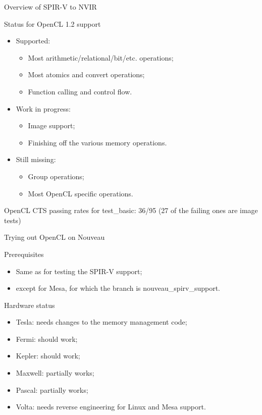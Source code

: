 \documentclass[11pt,english,compress]{beamer}
\begin{document}
\begin{frame}{Overview of SPIR-V to NVIR}
	\begin{block}{Status for OpenCL 1.2 support}
		\begin{itemize}
			\item Supported:
			\begin{itemize}
				\item Most arithmetic/relational/bit/etc. operations;
				\item Most atomics and convert operations;
				\item Function calling and control flow.
			\end{itemize}
			\item Work in progress:
			\begin{itemize}
				\item Image support;
				\item Finishing off the various memory operations.
			\end{itemize}
			\item Still missing:
			\begin{itemize}
				\item Group operations;
				\item Most OpenCL specific operations.
			\end{itemize}
		\end{itemize}

		OpenCL CTS passing rates for test\_basic: 36/95 (27 of the
		failing ones are image tests)
	\end{block}
\end{frame}

\begin{frame}{Trying out OpenCL on Nouveau}
	\begin{block}{Prerequisites}
		\begin{itemize}
			\item Same as for testing the SPIR-V support;
			\item except for Mesa, for which the branch is
				nouveau\_spirv\_support.
		\end{itemize}
	\end{block}
	\begin{block}{Hardware status}
		\begin{itemize}
			\item Tesla: needs changes to the memory management
				code;
			\item Fermi: should work;
			\item Kepler: should work;
			\item Maxwell: partially works;
			\item Pascal: partially works;
			\item Volta: needs reverse engineering for Linux and
				Mesa support.
		\end{itemize}
	\end{block}
\end{frame}
\end{document}
